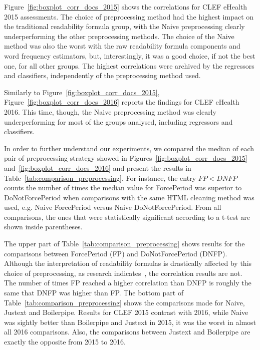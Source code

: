 Figure~\ref{fig:boxplot_corr_docs_2015} shows the correlations for CLEF eHealth 2015 assessments.
The choice of preprocessing method had the highest impact on the traditional readability formula group, with the Naive preprocessing clearly underperforming the other preprocessing methods. The choice of the Naive method was also the worst with the raw readability formula components and word frequency estimators, but, interestingly, it was a good choice, if not the best one, for all other groups.
The highest correlations were archived by the regressors and classifiers, independently of the preprocessing method used.


Similarly to Figure~\ref{fig:boxplot_corr_docs_2015}, Figure~\ref{fig:boxplot_corr_docs_2016} reports the findings for CLEF eHealth 2016. This time, though, the Naive preprocessing method was clearly underperforming for most of the groups analysed, including regressors and classifiers.

In order to further understand our experiments, we compared the median of each pair of preprocessing strategy showed in Figures~\ref{fig:boxplot_corr_docs_2015} and~\ref{fig:boxplot_corr_docs_2016} and present the results in Table~\ref{tab:comparison_preprocessing}. 
For instance, the entry $\mathit{FP < DNFP}$ counts the number of times the median value for ForcePeriod was superior to DoNotForcePeriod when comparisons with the same HTML cleaning method was used, e.g. Naive ForcePeriod versus Naive DoNotForcePeriod. From all comparisons, the ones that were statistically significant according to a t-test are shown inside parentheses.

The upper part of Table~\ref{tab:comparison_preprocessing} shows results for the comparisons between ForcePeriod (FP) and DoNotForcePeriod (DNFP). Although the interpretation of readability formulas is drastically affected by this choice of preprocessing, as research indicates~\cite{palotti15}, the correlation results are not.
The number of times FP reached a higher correlation than DNFP is roughly the same that DNFP was higher than FP.
The bottom part of Table~\ref{tab:comparison_preprocessing} shows the comparisons made for Naive, Justext and Boilerpipe. Results for CLEF 2015 contrast with 2016, while Naive was sightly better than Boilerpipe and Justext in 2015, it was the worst in almost all 2016 comparisons. Also, the comparisons between Justext and Boilerpipe are exactly the opposite from 2015 to 2016.

